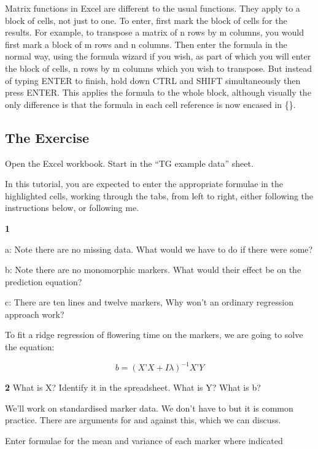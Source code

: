 \documentclass[
]{book}
\makeatletter
\newenvironment{kframe}{%
\medskip{}
\setlength{\fboxsep}{.8em}
 \def\at@end@of@kframe{}%
 \ifinner\ifhmode%
  \def\at@end@of@kframe{\end{minipage}}%
  \begin{minipage}{\columnwidth}%
 \fi\fi%
 \def\FrameCommand##1{\hskip\@totalleftmargin \hskip-\fboxsep
 \colorbox{shadecolor}{##1}\hskip-\fboxsep
     \hskip-\linewidth \hskip-\@totalleftmargin \hskip\columnwidth}%
 \MakeFramed {\advance\hsize-\width
   \@totalleftmargin\z@ \linewidth\hsize
   \@setminipage}}%
 {\par\unskip\endMakeFramed%
 \at@end@of@kframe}
\newenvironment{rmdblock}[1]
  {
  \begin{itemize}
  \renewcommand{\labelitemi}{
    \raisebox{-.7\height}[0pt][0pt]{
      {\setkeys{Gin}{width=3em,keepaspectratio}\texttt{[image: images/\#1]}}
    }
  }
  \setlength{\fboxsep}{1em}
  \begin{kframe}
  \item
  }
  {
  \end{kframe}
  \end{itemize}
  }
\newenvironment{rmdquiz}
  {\begin{rmdblock}{quiz}}
  {\end{rmdblock}}
\makeatother
\begin{document}
Matrix functions in Excel are different to the usual functions. They apply to a block of cells, not just to one. To enter, first mark the block of cells for the results. For example, to transpose a matrix of n rows by m columns, you would first mark a block of m rows and n columns. Then enter the formula in the normal way, using the formula wizard if you wish, as part of which you will enter the block of cells, n rows by m columns which you wish to transpose. But instead of typing ENTER to finish, hold down CTRL and SHIFT simultaneously then press ENTER. This applies the formula to the whole block, although visually the only difference is that the formula in each cell reference is now encased in \{\}.

\hypertarget{the-exercise-5}{%
\subsection{The Exercise}\label{the-exercise-5}}

Open the Excel workbook. Start in the ``TG example data'' sheet.

In this tutorial, you are expected to enter the appropriate formulae in the highlighted cells, working through the tabs, from left to right, either following the instructions below, or following me.

\begin{rmdquiz}
\textbf{1}

a: Note there are no missing data. What would we have to do if there were some?

b: Note there are no monomorphic markers. What would their effect be on the prediction equation?

c: There are ten lines and twelve markers, Why won't an ordinary regression approach work?
\end{rmdquiz}

To fit a ridge regression of flowering time on the markers, we are going to solve the equation:

\[b = (X’X+Iλ)^{-1} X’Y\]

\begin{rmdquiz}
\textbf{2} What is X? Identify it in the spreadsheet. What is Y? What is b?
\end{rmdquiz}

We'll work on standardised marker data. We don't have to but it is common practice. There are arguments for and against this, which we can discuss.

Enter formulae for the mean and variance of each marker where indicated
\end{document}
